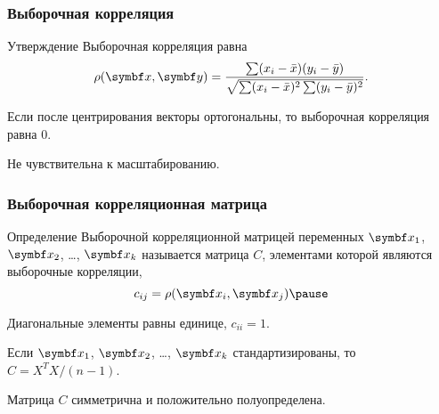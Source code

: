 \begin{frame}
  \frametitle{Выборочная корреляция}

  \begin{block}{Утверждение}
    Выборочная корреляция равна 
    \[
      \rho(\bx, \by) = \frac{\sum (x_i - \bar x)(y_i - \bar y)}{\sqrt{\sum (x_i - \bar x)^2 \sum (y_i - \bar y)^2}}.
    \]
  \end{block}

 
  Если после центрирования векторы ортогональны, то выборочная корреляция равна $0$. \pause

  Не чувствительна к масштабированию.

\end{frame}


\begin{frame}
  \frametitle{Выборочная корреляционная матрица}

  \begin{block}{Определение}
  \alert{Выборочной корреляционной матрицей} переменных $\bx_1$, $\bx_2$, \ldots, $\bx_k$ называется
  матрица $C$, элементами которой являются выборочные корреляции,
  \[
  c_{ij} = \rho(\bx_i, \bx_j) \pause
  \] 
  \end{block}

  Диагональные элементы равны единице, $c_{ii}=1$. \pause

  Если $\bx_1$, $\bx_2$, \ldots, $\bx_k$ стандартизированы, то $C=X^TX/(n-1)$. \pause

  Матрица $C$ симметрична и положительно полуопределена. 

\end{frame}



